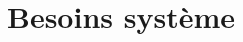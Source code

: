 \documentclass[master.tex]{subfiles}
\begin{document}
\chapter{Besoins système}



%
\end{document}
